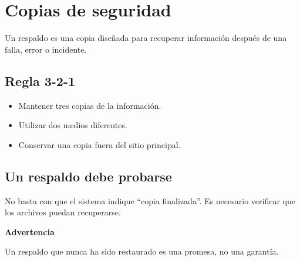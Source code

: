 \documentclass[
  spanish,
  letterpaper,
]{scrbook}
\providecommand{\tightlist}{%
  \setlength{\itemsep}{0pt}\setlength{\parskip}{0pt}}
\begin{document}

\chapter{Copias de seguridad}\label{copias-de-seguridad}

Un respaldo es una copia diseñada para recuperar información después de
una falla, error o incidente.

\section{Regla 3-2-1}\label{regla-3-2-1}

\begin{itemize}
\tightlist
\item
  Mantener tres copias de la información.
\item
  Utilizar dos medios diferentes.
\item
  Conservar una copia fuera del sitio principal.
\end{itemize}

\section{Un respaldo debe probarse}\label{un-respaldo-debe-probarse}

No basta con que el sistema indique ``copia finalizada''. Es necesario
verificar que los archivos puedan recuperarse.

\begin{tcolorbox}[enhanced jigsaw, arc=.35mm, bottomrule=.15mm, breakable, colback=white, colframe=quarto-callout-warning-color-frame, left=2mm, leftrule=.75mm, opacityback=0, rightrule=.15mm, toprule=.15mm]
\begin{minipage}[t]{5.5mm}
\textcolor{quarto-callout-warning-color}{\faExclamationTriangle}
\end{minipage}%
\begin{minipage}[t]{\textwidth - 5.5mm}

\vspace{-3mm}\textbf{Advertencia}\vspace{3mm}

Un respaldo que nunca ha sido restaurado es una promesa, no una
garantía.

\end{minipage}%
\end{tcolorbox}

\end{document}
